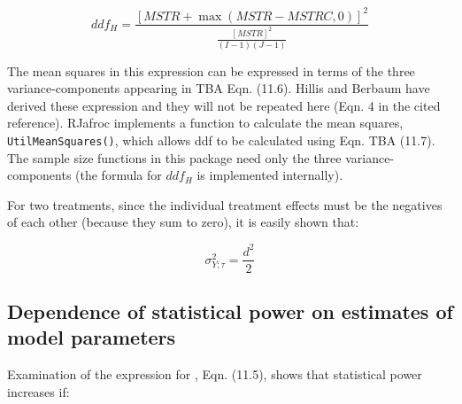 \documentclass[
]{book}
\begin{document}
\begin{equation}
ddf_H=\frac{\left [MSTR+\max(MSTR-MSTRC,0)  \right ]^2}{\frac{[MSTR]^2}{(I-1)(J-1)}}
\label{eq:ddfH1}
\end{equation}

The mean squares in this expression can be expressed in terms of the three variance-components appearing in TBA Eqn. (11.6). Hillis and Berbaum \citep{RN1476} have derived these expression and they will not be repeated here (Eqn. 4 in the cited reference). RJafroc implements a function to calculate the mean squares, \texttt{UtilMeanSquares()}, which allows ddf to be calculated using Eqn. TBA (11.7). The sample size functions in this package need only the three variance-components (the formula for \(ddf_H\) is implemented internally).

For two treatments, since the individual treatment effects must be the negatives of each other (because they sum to zero), it is easily shown that:

\begin{equation}
\sigma_{Y;\tau}^2=\frac{d^2}{2}
\label{eq:sigma2Tau1}
\end{equation}

\hypertarget{RocSampleSizeOR-dependence-of-stats-power}{%
\subsection{Dependence of statistical power on estimates of model parameters}\label{RocSampleSizeOR-dependence-of-stats-power}}

Examination of the expression for , Eqn. (11.5), shows that statistical power increases if:
\end{document}
